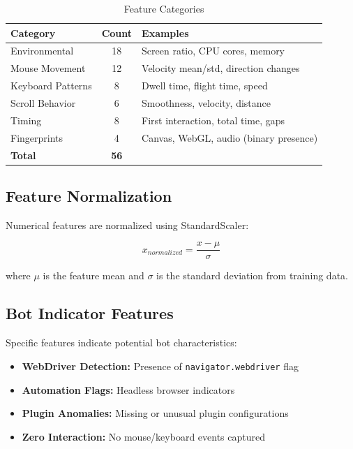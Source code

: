 \begin{table}[H]
\centering
\caption{Feature Categories}
\label{tab:features}
\begin{tabular}{|l|c|l|}
\hline
\textbf{Category} & \textbf{Count} & \textbf{Examples} \\
\hline
Environmental & 18 & Screen ratio, CPU cores, memory \\
\hline
Mouse Movement & 12 & Velocity mean/std, direction changes \\
\hline
Keyboard Patterns & 8 & Dwell time, flight time, speed \\
\hline
Scroll Behavior & 6 & Smoothness, velocity, distance \\
\hline
Timing & 8 & First interaction, total time, gaps \\
\hline
Fingerprints & 4 & Canvas, WebGL, audio (binary presence) \\
\hline
\textbf{Total} & \textbf{56} & \\
\hline
\end{tabular}
\end{table}

\subsection{Feature Normalization}

Numerical features are normalized using StandardScaler:

$$x_{normalized} = \frac{x - \mu}{\sigma}$$

where $\mu$ is the feature mean and $\sigma$ is the standard deviation from training data.

\subsection{Bot Indicator Features}

Specific features indicate potential bot characteristics:
\begin{itemize}
    \item \textbf{WebDriver Detection:} Presence of \texttt{navigator.webdriver} flag
    \item \textbf{Automation Flags:} Headless browser indicators
    \item \textbf{Plugin Anomalies:} Missing or unusual plugin configurations
    \item \textbf{Zero Interaction:} No mouse/keyboard events captured
\end{itemize}

